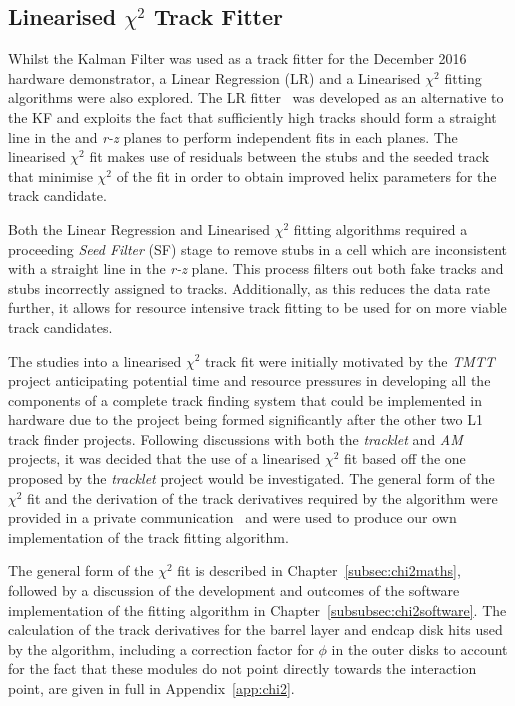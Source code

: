 \subsection{Linearised $\chi^{2}$ Track Fitter}\label{subsec:chi2}

Whilst the Kalman Filter was used as a track fitter for the December 2016 hardware demonstrator, a Linear Regression (LR) and a Linearised $\chi^{2}$ fitting algorithms were also explored.
The LR fitter~\cite{TMTT_FLP} was developed as an alternative to the KF and exploits the fact that sufficiently high \pT tracks should form a straight line in the \emph{\rphi} and \emph{r-z} planes to perform independent fits in each planes.
The linearised $\chi^{2}$ fit makes use of residuals between the stubs and the seeded track that minimise $\chi^{2}$ of the fit in order to obtain improved helix parameters for the track candidate.

Both the Linear Regression and Linearised $\chi^{2}$ fitting algorithms required a proceeding \emph{Seed Filter} (SF) stage to remove stubs in a \HT cell which are inconsistent with a straight line in the \emph{r-z} plane.
This process filters out both fake tracks and stubs incorrectly assigned to tracks.
Additionally, as this reduces the data rate further, it allows for resource intensive track fitting to be used for on more viable track candidates.

The studies into a linearised $\chi^{2}$ track fit were initially motivated by the \emph{TMTT} project anticipating potential time and resource pressures in developing all the components of a complete track finding system that could be implemented in hardware due to the project being formed significantly after the other two L1 track finder projects.
Following discussions with both the \emph{tracklet} and \emph{AM} projects, it was decided that the use of a linearised $\chi^{2}$ fit based off the one proposed by the \emph{tracklet} project would be investigated.
The general form of the $\chi^{2}$ fit and the derivation of the track derivatives required by the algorithm were provided in a private communication~\cite{CMS_DN-14-043} and were used to produce our own implementation of the track fitting algorithm.

The general form of the $\chi^{2}$ fit is described in Chapter~\ref{subsec:chi2maths}, followed by a discussion of the development and outcomes of the software implementation of the fitting algorithm in Chapter~\ref{subsubsec:chi2software}.
The calculation of the track derivatives for the barrel layer and endcap disk hits used by the algorithm, including a correction factor for $\phi$ in the outer disks to account for the fact that these modules do not point directly towards the interaction point, are given in full in Appendix~\ref{app:chi2}.

